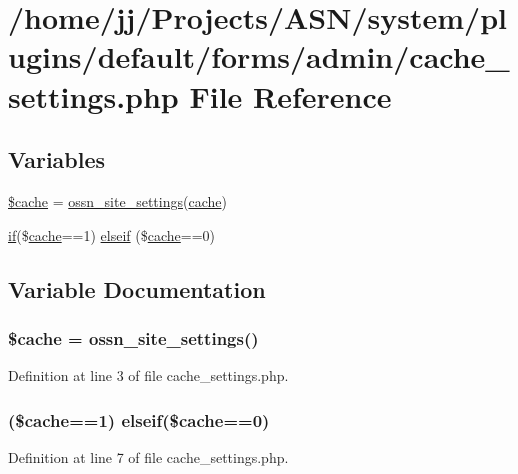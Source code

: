 \hypertarget{cache__settings_8php}{}\section{/home/jj/\+Projects/\+A\+S\+N/system/plugins/default/forms/admin/cache\+\_\+settings.php File Reference}
\label{cache__settings_8php}
\subsection*{Variables}
\begin{DoxyCompactItemize}
\item 
\hyperlink{cache__settings_8php_ac2dc76d756ec398393d4b1d23659276c}{\$cache} = \hyperlink{ossn_8lib_8system_8php_a610e2045b8a86c09f777b4d82e24e34c}{ossn\+\_\+site\+\_\+settings}(\textquotesingle{}\hyperlink{jquery_8tokeninput_8js_a521016aa0ca9ff38bfba60ab069cb34b}{cache}\textquotesingle{})
\item 
\hyperlink{jquery_8tokeninput_8js_ad8dd46a3cbc004569e34401e9e71771a}{if}(\$\hyperlink{jquery_8tokeninput_8js_a521016aa0ca9ff38bfba60ab069cb34b}{cache}==1) \hyperlink{cache__settings_8php_aac633c7b6b07fcf67f4504fb5c57a856}{elseif} (\$\hyperlink{jquery_8tokeninput_8js_a521016aa0ca9ff38bfba60ab069cb34b}{cache}==0)
\end{DoxyCompactItemize}


\subsection{Variable Documentation}
\subsubsection[{\texorpdfstring{\$cache}{$cache}}]{\setlength{\rightskip}{0pt plus 5cm}\${\bf cache} = {\bf ossn\+\_\+site\+\_\+settings}(\textquotesingle{})}\hypertarget{cache__settings_8php_ac2dc76d756ec398393d4b1d23659276c}{}\label{cache__settings_8php_ac2dc76d756ec398393d4b1d23659276c}


Definition at line 3 of file cache\+\_\+settings.\+php.

\subsubsection[{\texorpdfstring{elseif}{elseif}}]{ (\${\bf cache}==1) elseif(\${\bf cache}==0)}\hypertarget{cache__settings_8php_aac633c7b6b07fcf67f4504fb5c57a856}{}\label{cache__settings_8php_aac633c7b6b07fcf67f4504fb5c57a856}


Definition at line 7 of file cache\+\_\+settings.\+php.


